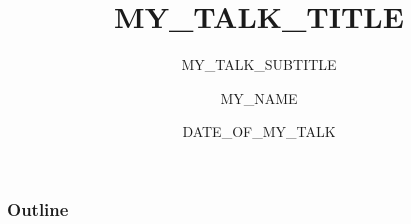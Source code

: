 \documentclass[t]{beamer}
\title{MY_TALK_TITLE}
\subtitle{MY_TALK_SUBTITLE}
\author{MY_NAME}
\institute{MY_INSTITUTION}
\date{DATE_OF_MY_TALK}
\begin{document}
\begin{frame}
\titlepage
\end{frame}

\begin{frame}
\frametitle{Outline}
\tableofcontents
\end{frame}


\end{document}
